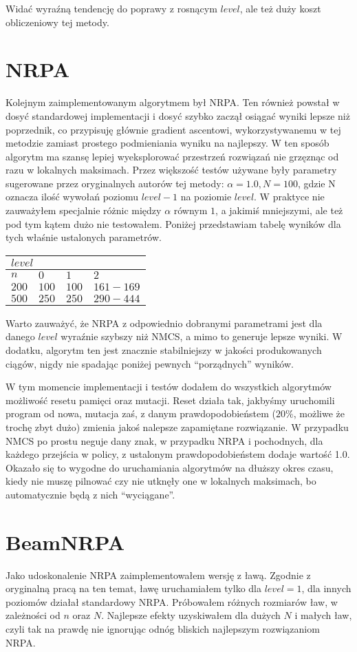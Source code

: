 \documentclass[a4paper,10pt]{article}
\begin{document}
Widać wyraźną tendencję do poprawy z rosnącym $level$, ale też duży koszt obliczeniowy tej metody.

\section{NRPA}
Kolejnym zaimplementowanym algorytmem był NRPA. Ten również powstał w dosyć standardowej implementacji i dosyć szybko zaczął osiągać wyniki lepsze niż poprzednik, co przypisuję głównie gradient ascentowi,
wykorzystywanemu w tej metodzie zamiast prostego podmieniania wyniku na najlepszy. W ten sposób algorytm ma szansę lepiej wyeksplorować przestrzeń rozwiązań nie grzęznąc od razu w lokalnych maksimach. Przez
większość testów używane były parametry sugerowane przez oryginalnych autorów tej metody: $\alpha = 1.0, N = 100$, gdzie N oznacza ilość wywołań poziomu $level - 1$ na poziomie $level$. W praktyce nie zauważyłem
specjalnie różnic między $\alpha$ równym $1$, a jakimiś mniejszymi, ale też pod tym kątem dużo nie testowałem. Poniżej przedstawiam tabelę wyników dla tych właśnie ustalonych parametrów.

\begin{adjustbox}{center}
\begin{tabularx}{0.7\linewidth}{|X|X|X|X| }
  \hline
  \multicolumn{4}{|X|}{$level$} \\
  \hline
  $n$ & $0$ & $1$ & $2$ \\
  \hline
  $200$ & $100$ & $100$ & $161-169$ \\
  \hline
  $500$ & $250$ & $250$ & $290-444$ \\
  \hline
\end{tabularx}
\end{adjustbox}

Warto zauważyć, że NRPA z odpowiednio dobranymi parametrami jest dla danego $level$ wyraźnie szybszy niż NMCS, a mimo to generuje lepsze wyniki. W dodatku, algorytm ten jest znacznie stabilniejszy w jakości
produkowanych ciągów, nigdy nie spadając poniżej pewnych ``porządnych'' wyników.

W tym momencie implementacji i testów dodałem do wszystkich algorytmów możliwość resetu pamięci oraz mutacji. Reset działa tak, jakbyśmy uruchomili program od nowa, mutacja zaś, z danym prawdopodobieństem
($20\%$, możliwe że trochę zbyt dużo) zmienia jakoś nalepsze zapamiętane rozwiązanie. W przypadku NMCS po prostu neguje dany znak, w przypadku NRPA i pochodnych, dla każdego przejścia w policy, z ustalonym
prawdopodobieństem dodaje wartość 1.0. Okazało się to wygodne do uruchamiania algorytmów na dłuższy okres czasu, kiedy nie muszę pilnować czy nie utknęły one w lokalnych maksimach, bo automatycznie będą z nich
``wyciągane''.

\section{BeamNRPA}
Jako udoskonalenie NRPA zaimplementowałem wersję z ławą. Zgodnie z oryginalną pracą na ten temat, ławę uruchamiałem tylko dla $level=1$, dla innych poziomów działał standardowy NRPA. Próbowałem różnych
rozmiarów ław, w zależności od $n$ oraz $N$. Najlepsze efekty uzyskiwałem dla dużych $N$ i małych ław, czyli tak na prawdę nie ignorując odnóg bliskich najlepszym rozwiązaniom NRPA.
\end{document}
